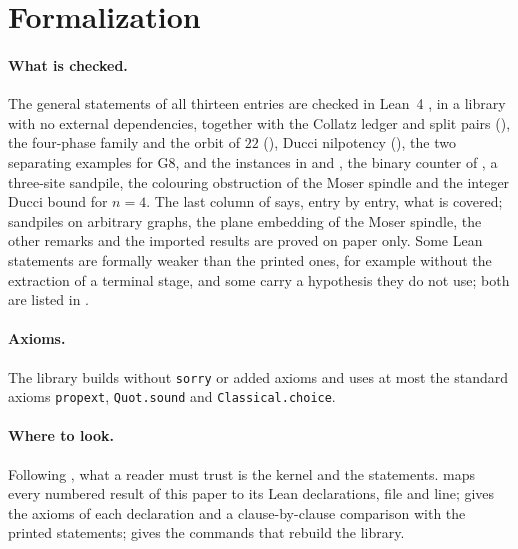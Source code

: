 \section{Formalization}\label{sec:lean}

\paragraph{What is checked.} The general statements of all thirteen entries are checked in Lean~4
\citep{DeMouraUllrich2021}, in a library with no external dependencies, together with the Collatz
ledger and split pairs (), the four-phase family and the
orbit of $22$ (), Ducci nilpotency (), the two
separating examples for G8, and the instances in 
and , the binary counter of , a three-site sandpile, the
colouring obstruction of the Moser spindle and the integer Ducci bound for $n = 4$. The last column of
 says, entry by entry, what is covered; sandpiles on arbitrary graphs, the
plane embedding of the Moser spindle, the other remarks and the imported results are proved on paper
only. Some Lean statements are formally weaker than the printed ones, for
example  without the extraction of a terminal stage, and some carry a hypothesis they
do not use; both are listed in .

\paragraph{Axioms.} The library builds without \texttt{sorry} or added axioms and uses at most the
standard axioms \texttt{propext}, \texttt{Quot.sound} and \texttt{Classical.choice}.

\paragraph{Where to look.} Following \citet{Pollack1998}, what a reader must trust is the kernel and
the statements.  maps every numbered result of this paper to its Lean
declarations, file and line;  gives the axioms of each declaration and a
clause-by-clause comparison with the printed statements;  gives the commands that
rebuild the library.
